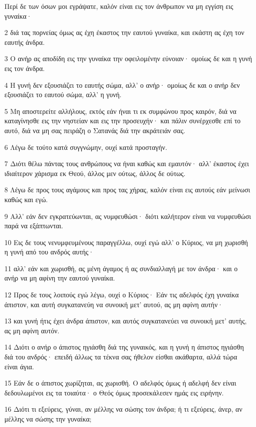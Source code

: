 \par Περί δε των όσων μοι εγράψατε, καλόν είναι εις τον άνθρωπον να μη εγγίση εις γυναίκα·
\par 2 διά τας πορνείας όμως ας έχη έκαστος την εαυτού γυναίκα, και εκάστη ας έχη τον εαυτής άνδρα.
\par 3 Ο ανήρ ας αποδίδη εις την γυναίκα την οφειλομένην εύνοιαν· ομοίως δε και η γυνή εις τον άνδρα.
\par 4 Η γυνή δεν εξουσιάζει το εαυτής σώμα, αλλ' ο ανήρ· ομοίως δε και ο ανήρ δεν εξουσιάζει το εαυτού σώμα, αλλ' η γυνή.
\par 5 Μη αποστερείτε αλλήλους, εκτός εάν ήναι τι εκ συμφώνου προς καιρόν, διά να καταγίνησθε εις την νηστείαν και εις την προσευχήν· και πάλιν συνέρχεσθε επί το αυτό, διά να μη σας πειράζη ο Σατανάς διά την ακράτειάν σας.
\par 6 Λέγω δε τούτο κατά συγγνώμην, ουχί κατά προσταγήν.
\par 7 Διότι θέλω πάντας τους ανθρώπους να ήναι καθώς και εμαυτόν· αλλ' έκαστος έχει ιδιαίτερον χάρισμα εκ Θεού, άλλος μεν ούτως, άλλος δε ούτως.
\par 8 Λέγω δε προς τους αγάμους και προς τας χήρας, καλόν είναι εις αυτούς εάν μείνωσι καθώς και εγώ.
\par 9 Αλλ' εάν δεν εγκρατεύωνται, ας νυμφευθώσι· διότι καλήτερον είναι να νυμφευθώσι παρά να εξάπτωνται.
\par 10 Εις δε τους νενυμφευμένους παραγγέλλω, ουχί εγώ αλλ' ο Κύριος, να μη χωρισθή η γυνή από του ανδρός αυτής·
\par 11 αλλ' εάν και χωρισθή, ας μένη άγαμος ή ας συνδιαλλαγή με τον άνδρα· και ο ανήρ να μη αφίνη την εαυτού γυναίκα.
\par 12 Προς δε τους λοιπούς εγώ λέγω, ουχί ο Κύριος· Εάν τις αδελφός έχη γυναίκα άπιστον, και αυτή συγκατανεύη να συνοική μετ' αυτού, ας μη αφίνη αυτήν·
\par 13 και γυνή ήτις έχει άνδρα άπιστον, και αυτός συγκατανεύει να συνοική μετ' αυτής, ας μη αφίνη αυτόν.
\par 14 Διότι ο ανήρ ο άπιστος ηγιάσθη διά της γυναικός, και η γυνή η άπιστος ηγιάσθη διά του ανδρός· επειδή άλλως τα τέκνα σας ήθελον είσθαι ακάθαρτα, αλλά τώρα είναι άγια.
\par 15 Εάν δε ο άπιστος χωρίζηται, ας χωρισθή. Ο αδελφός όμως ή αδελφή δεν είναι δεδουλωμένοι εις τα τοιαύτα· ο Θεός όμως προσεκάλεσεν ημάς εις ειρήνην.
\par 16 Διότι τι εξεύρεις, γύναι, αν μέλλης να σώσης τον άνδρα; ή τι εξεύρεις, άνερ, αν μέλλης να σώσης την γυναίκα;
